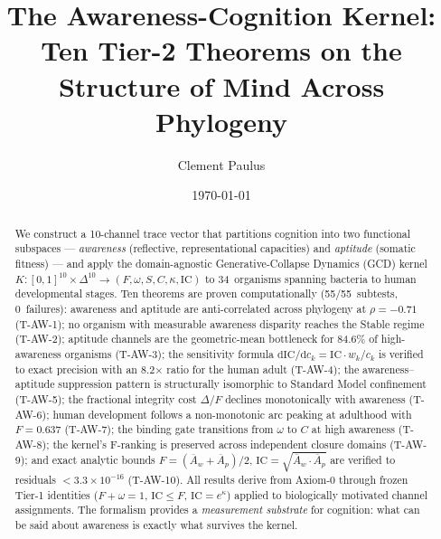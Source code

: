 \documentclass[
  aps,
  prd,
  twocolumn,
  superscriptaddress,
  nofootinbib,
  floatfix
]{revtex4-2}
\newcommand{\dd}{\mathrm{d}}
\newcommand{\IC}{\mathrm{IC}}
\newcommand{\Aw}{\overline{A}_{\!w}}
\newcommand{\Ap}{\overline{A}_{\!p}}
\begin{document}
\title{The Awareness-Cognition Kernel:\\
Ten Tier-2 Theorems on the Structure of Mind Across Phylogeny}

\author{Clement Paulus}

\date{\today}

\begin{abstract}
We construct a 10-channel trace vector that partitions
cognition into two functional subspaces --- \emph{awareness}
(reflective, representational capacities) and \emph{aptitude}
(somatic fitness) --- and apply the domain-agnostic
Generative-Collapse Dynamics (GCD) kernel
$K\!: [0,1]^{10} \times \Delta^{10}
\to (F, \omega, S, C, \kappa, \IC)$
to 34~organisms spanning bacteria to human
developmental stages.
Ten theorems are proven computationally (55/55~subtests,
0~failures): awareness and aptitude are anti-correlated across
phylogeny at $\rho = -0.71$ (T-AW-1); no organism with
measurable awareness disparity reaches the Stable regime
(T-AW-2); aptitude channels are the geometric-mean bottleneck
for 84.6\% of high-awareness organisms (T-AW-3); the
sensitivity formula $\dd\!\IC/\dd c_k = \IC \cdot w_k / c_k$
is verified to exact precision with an 8.2$\times$ ratio for
the human adult (T-AW-4); the awareness--aptitude suppression
pattern is structurally isomorphic to Standard Model
confinement (T-AW-5); the fractional integrity cost
$\Delta/F$ declines monotonically with awareness (T-AW-6);
human development follows a non-monotonic arc peaking at
adulthood with $F = 0.637$ (T-AW-7); the binding gate
transitions from $\omega$ to $C$ at high awareness (T-AW-8);
the kernel's F-ranking is preserved across independent
closure domains (T-AW-9); and exact analytic bounds
$F = (\Aw + \Ap)/2$, $\IC = \sqrt{\Aw \cdot \Ap}$ are
verified to residuals $< 3.3 \times 10^{-16}$ (T-AW-10).
All results derive from Axiom-0 through frozen Tier-1
identities ($F + \omega = 1$, $\IC \leq F$,
$\IC = e^{\kappa}$) applied to biologically motivated
channel assignments.  The formalism provides a
\emph{measurement substrate} for cognition: what can be
said about awareness is exactly what survives the kernel.
\end{abstract}

\maketitle
\end{document}

